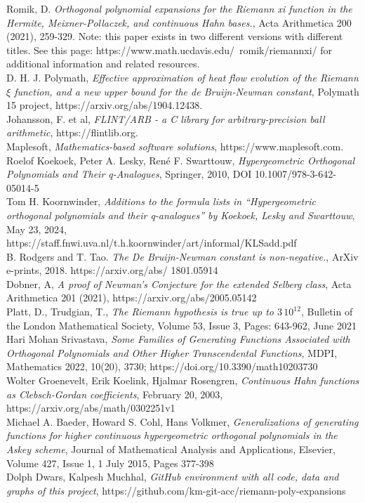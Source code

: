 \documentclass[a4paper,11pt,twoside]{amsart}
\begin{document}
\pagebreak
\begin{thebibliography}{} 
Romik, D. \emph{Orthogonal polynomial expansions for the Riemann xi function in the Hermite, Meixner-Pollaczek, and continuous Hahn bases.}, Acta Arithmetica 200 (2021), 259-329.
Note: this paper exists in two different versions with different titles. See this page: https://www.math.ucdavis.edu/~romik/riemannxi/ for additional information and related resources. \\
D. H. J. Polymath, \emph{Effective approximation of heat flow evolution of the Riemann $\xi$ function, and a new upper bound for the de Bruijn-Newman constant}, Polymath 15 project, https://arxiv.org/abs/1904.12438.\\
Johansson, F. et al, \emph{FLINT/ARB - a C library for arbitrary-precision ball arithmetic}, https://flintlib.org.\\
Maplesoft, \emph{Mathematics-based software solutions}, https://www.maplesoft.com.\\
Roelof Koekoek, Peter A. Lesky, René F. Swarttouw, \emph{Hypergeometric Orthogonal Polynomials and Their q-Analogues}, Springer, 2010, DOI 10.1007/978-3-642-05014-5\\
Tom H. Koornwinder, \emph{Additions to the formula lists in “Hypergeometric orthogonal polynomials and their q-analogues” by Koekoek, Lesky and Swarttouw}, May 23, 2024, https://staff.fnwi.uva.nl/t.h.koornwinder/art/informal/KLSadd.pdf\\
B. Rodgers and T. Tao. \emph{The De Bruijn-Newman constant is non-negative.}, ArXiv e-prints, 2018. https://arxiv.org/abs/ 1801.05914\\
Dobner, A, \emph{A proof of Newman’s Conjecture for the extended Selberg class}, Acta Arithmetica 201 (2021), https://arxiv.org/abs/2005.05142\\
Platt, D., Trudgian, T., \emph{The Riemann hypothesis is true up to $3\,10^{12}$}, Bulletin of the London Mathematical Society, Volume 53, Issue 3, Pages: 643-962, June 2021\\
Hari Mohan Srivastava, \emph{Some Families of Generating Functions Associated with Orthogonal Polynomials and Other Higher Transcendental Functions}, MDPI, Mathematics 2022, 10(20), 3730; https://doi.org/10.3390/math10203730\\
Wolter Groenevelt, Erik Koelink, Hjalmar Rosengren, \emph{Continuous Hahn functions as Clebsch-Gordan coefficients}, February 20, 2003, https://arxiv.org/abs/math/0302251v1\\
Michael A. Baeder, Howard S. Cohl, Hans Volkmer, \emph{Generalizations of generating functions for higher continuous hypergeometric orthogonal polynomials in the Askey scheme}, Journal of Mathematical Analysis and Applications, Elsevier, Volume 427, Issue 1, 1 July 2015, Pages 377-398\\
Dolph Dwars, Kalpesh Muchhal, \emph{GitHub environment with all code, data and graphs of this project}, https://github.com/km-git-acc/riemann-poly-expansions
\end{thebibliography}{} 
\end{document}
